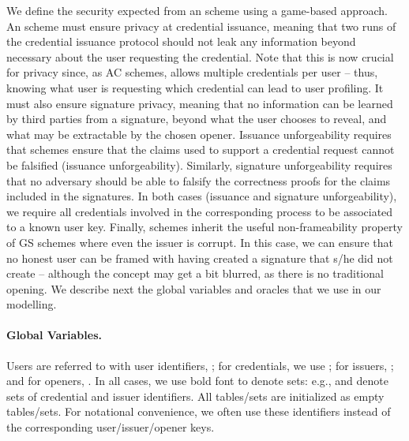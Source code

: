 We define the security expected from an \UAS scheme using a game-based approach.
An \UAS scheme must ensure privacy at credential issuance, meaning that two
runs of the credential issuance protocol should not leak any information beyond
necessary about the user requesting the credential. Note that this is now
crucial for privacy since, as AC schemes, \UAS allows multiple credentials per
user -- thus, knowing what user is requesting which credential can lead to user
profiling. It must also ensure signature privacy, meaning that no information
can be learned by third parties from a signature, beyond what the user chooses
to reveal, and what may be extractable by the chosen opener. Issuance
unforgeability requires that \UAS schemes ensure that the claims used to support
a credential request cannot be falsified (issuance unforgeability). Similarly,
signature unforgeability requires that no adversary should be able to falsify
the correctness proofs for the claims included in the signatures. In both cases
(issuance and signature unforgeability), we require all credentials involved in
the corresponding process to be associated to a known user key. Finally, \UAS
schemes inherit the useful non-frameability property of GS schemes where even
the issuer is corrupt. In this case, we can ensure that no honest user
can be framed with having created a signature that s/he did not create --
although the concept may get a bit blurred, as there is no traditional opening.
%
We describe next the global variables and oracles that we use in our modelling.

\paragraph{Global Variables.} %
Users are referred to with user identifiers, \uid; for credentials, we use \cid;
for issuers, \iid; and for openers, \oid.  In all cases, we use bold font to
denote sets: e.g., \scid and \siid denote sets of credential and issuer
identifiers. All tables/sets are initialized as empty tables/sets. For
notational convenience, we often use these identifiers instead of the
corresponding user/issuer/opener keys.


